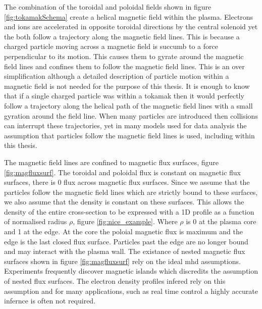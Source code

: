 The combination of the toroidal and poloidal fields shown in figure \ref{fig:tokamakSchema} create a helical magnetic field within the plasma. Electrons and ions are accelerated in opposite toroidal directions by the central solenoid yet the both follow a trajectory along the magnetic field lines. This is because a charged particle moving across a magnetic field is succumb to a force perpendicular to its motion. This causes them to gyrate around the magnetic field lines and confines them to follow the magnetic field lines. This is an over simplification although a detailed description of particle motion within a magnetic field is not needed for the purpose of this thesis. It is enough to know that if a single charged particle was within a tokamak then it would perfectly follow a trajectory along the helical path of the magnetic field lines with a small gyration around the field line. When many particles are introduced then collisions can interrupt these trajectories, yet in many models used for data analysis the assumption that particles follow the magnetic field lines is used, including within this thesis. 

The magnetic field lines are confined to magnetic flux surfaces, figure \ref{fig:magfluxsurf}. The toroidal and poloidal flux is constant on magnetic flux surfaces, there is 0 flux across magnetic flux surfaces. Since we assume that the particles follow the magnetic field lines which are strictly bound to these surfaces, we also assume that the density is constant on these surfaces. This allows the density of the entire cross-section to be expressed with a 1D profile as a function of normalised radius $\rho$, figure \ref{fig:nice_example}. Where $\rho$ is 0 at the plasma core and 1 at the edge. At the core the poloial magnetic flux is maximum and the edge is the last closed flux surface. Particles past the edge are no longer bound and may interact with the plasma wall. The existance of nested magnetic flux surfaces shown in figure \ref{fig:magfluxsurf} rely on the ideal \gls{mhd} assumptions. Experiments frequently discover magnetic islands which discredits the assumption of nested flux surfaces. The electron density profiles infered rely on this assumption and for many applications, such as real time control a highly accurate infernce is often not required.

